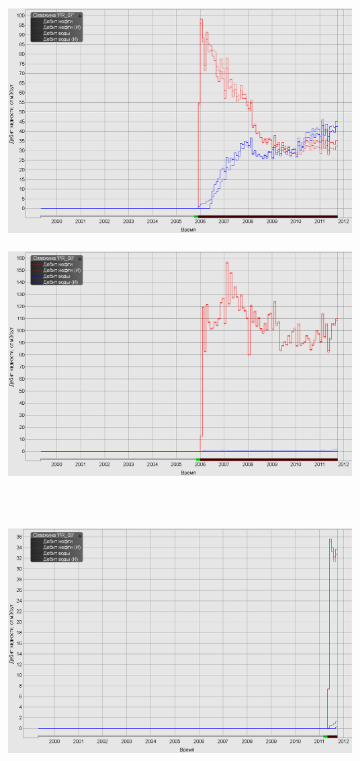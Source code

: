 \documentclass[a4paper,12pt]{article}
\begin{document}
\begin{figure}[H]
	\begin{subfigure}[t]{\dimexpr.5\linewidth-1.3em\relax}
		\centering
		\includegraphics[width=.95\linewidth]{aw7}
	\end{subfigure}
\hfill %
	\begin{subfigure}[t]{\dimexpr.5\linewidth-1.3em\relax}
		\centering
		\includegraphics[width=.95\linewidth]{aw8}
	\end{subfigure}
\\[20pt]
\begin{subfigure}[t]{\dimexpr.5\linewidth-1.3em\relax}
	\centering
	\includegraphics[width=.95\linewidth]{aw9}

\end{subfigure}
\end{figure}
\end{document}
